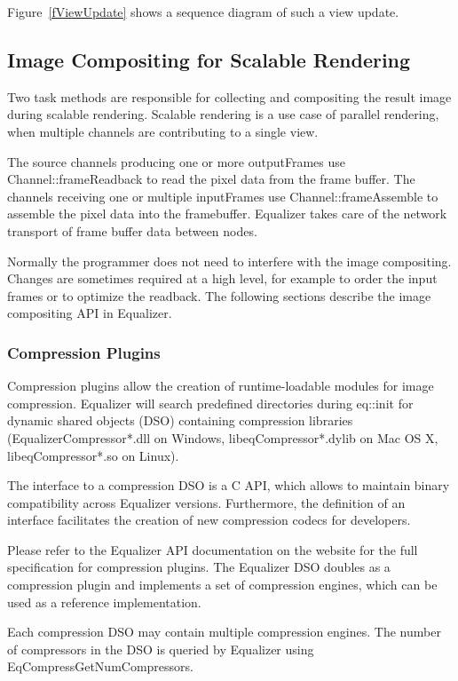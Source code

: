 \documentclass[10pt,a4]{scrartcl}
\newcommand{\fig}[1]{Figure~\ref{#1}}
\begin{document}
\fig{fViewUpdate} shows a sequence diagram of such a view update.


\subsection{\label{sCompositing}Image Compositing for Scalable Rendering}

Two task methods are responsible for collecting and compositing the
result image during scalable rendering. Scalable rendering is a use case
of parallel rendering, when multiple channels are contributing to a single
view. 

The source channels producing one or more \textsf{outputFrame}s use
\textsf{Channel::frame\-Read\-back} to read the pixel data from the frame
buffer. The channels receiving one or multiple \textsf{inputFrame}s use
\textsf{Channel::frameAssemb\-le} to assemble the pixel data into the
framebuffer. Equalizer takes care of the network transport of frame
buffer data between nodes.

Normally the programmer does not need to interfere with the image
compositing. Changes are sometimes required at a high level, for example
to order the input frames or to optimize the readback. The following
sections describe the image compositing API in Equalizer.

\subsubsection{Compression Plugins}

Compression plugins allow the creation of runtime-loadable modules for
image compression. Equalizer will search predefined directories during
\textsf{eq::init} for dynamic shared objects (DSO) containing compression
libraries (EqualizerCompressor*.dll on Windows, libeqCompressor*.dylib
on Mac OS X, libeqCompressor*.so on Linux).

The interface to a compression DSO is a C API, which allows to maintain
binary compatibility across Equalizer versions. Furthermore, the
definition of an interface facilitates the creation of new compression
codecs for developers. 

Please refer to the Equalizer API documentation on the website for the
full specification for compression plugins. The Equalizer DSO doubles as
a compression plugin and implements a set of compression engines, which
can be used as a reference implementation.

Each compression DSO may contain multiple compression engines. The
number of compressors in the DSO is queried by Equalizer using
\textsf{EqCompressGetNumCompressors}. 
\end{document}

